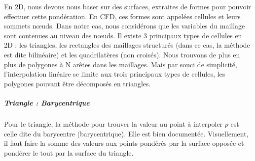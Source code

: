 En 2D, nous devons nous baser sur des surfaces, extraites de formes pour pouvoir effectuer cette pondération. En CFD, ces formes sont appelées cellules et leurs sommets nœuds. Dans notre cas, nous considérons que les variables du maillage sont contenues au niveau des nœuds. 
Il existe 3 principaux types de cellules en 2D : les triangles, les rectangles des maillages structurés (dans ce cas, la méthode est dite bilinéaire) et les quadrilatères (non croisés).
Nous trouvons de plus en plus de polygones à N arêtes dans les maillages. Mais par souci de simplicité, l'interpolation linéaire se limite aux trois principaux types de cellules, les polygones pouvant être décomposés en triangles. %

\subparagraph{Triangle : Barycentrique}

Pour le triangle, la méthode pour trouver la valeur au point à interpoler \( p \) est celle dite du barycentre (barycentrique).
Elle est bien documentée.
Visuellement, il faut faire la somme des valeurs aux points pondérés par la surface opposée et pondérer le tout par la surface du triangle.

